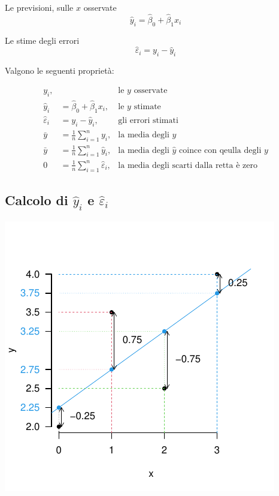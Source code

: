 \documentclass[
  11pt,
]{book}
\theoremstyle{mytheoremstyle}
\theoremstyle{mydefstyle}
\begin{document}
Le previsioni, sulle \(x\) osservate
\[\hat y_i=\hat\beta_0+\hat\beta_1x_i\]

Le stime degli errori
\[\hat\varepsilon_i = y_i-\hat y_i\]

Valgono le seguenti proprietà:

\begin{info}
\[
\begin{aligned}
y_i, & & \text{le $y$ osservate}\\
\hat y_i &= \hat \beta_0+\hat\beta_1x_i,&\text{le $y$ stimate}\\
\hat\varepsilon_i &= y_i-\hat y_i,&\text{gli errori stimati}\\
\bar y &= \frac 1 n\sum_{i=1}^n y_i, &\text{la media degli $y$}\\
\bar y &= \frac 1 n\sum_{i=1}^n \hat y_i, &\text{la media degli $\hat y$ coince con qeulla degli $y$}\\
0 &=\frac 1 n\sum_{i=1}^n\hat\varepsilon_i , &\text{la media degli scarti dalla retta è zero}
\end{aligned}
\]

\end{info}

\subsection{\texorpdfstring{Calcolo di \(\hat y_i\) e \(\hat\varepsilon_i\)}{Calcolo di \textbackslash hat y\_i e \textbackslash hat\textbackslash varepsilon\_i}}\label{calcolo-di-hat-y_i-e-hatvarepsilon_i}

\begin{center}\includegraphics{Appunti_di_Statistica_2025_files/figure-latex/17-regressione-I-45-1} \end{center}
\end{document}
